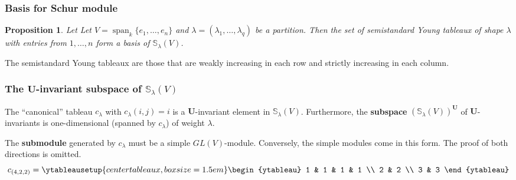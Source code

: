 \documentclass[mathserif]{beamer}
\DeclareMathOperator{\Span}{span}
\newtheorem*{proposition}{Proposition}
\begin{document}
%
\begin{frame}

    \frametitle{Basis for Schur module}
    \begin{proposition}
        Let Let $V = \Span_k\{e_1,\dots,e_n\}$ and $\lambda = (\lambda_1,\dots,\lambda_q)$ be a partition. Then the set of semistandard Young tableaux of shape $\lambda$ with entries from $1,\dots,n$ form a basis of $\mathbb{S}_\lambda(V)$.
    \end{proposition}

    The semistandard Young tableaux are those that are weakly increasing in each row and strictly increasing in each column.

\end{frame}

%
\begin{frame}
    \frametitle{The $\mathbf{U}$-invariant subspace of $\mathbb{S}_\lambda(V)$}

    The ``canonical'' tableau $c_\lambda$ with $c_\lambda(i,j) = i$ is a $\mathbf{U}$-invariant element in $\mathbb{S}_\lambda(V)$. Furthermore, the \textbf{subspace} $(\mathbb{S}_\lambda(V))^{\mathbf{U}}$ of $\mathbf{U}$-invariants is one-dimensional (spanned by $c_\lambda$) of weight $\lambda$.

    The \textbf{submodule} generated by $c_\lambda$ must be a simple $GL(V)$-module. Conversely, the simple modules come in this form. The proof of both directions is omitted.
    \[c_{(4,2,2)} = \ytableausetup{centertableaux, boxsize=1.5em}
    \begin{ytableau}
    1 & 1 & 1 & 1 \\
    2 & 2 \\
    3 & 3
    \end{ytableau}\]

\end{frame}
\end{document}
